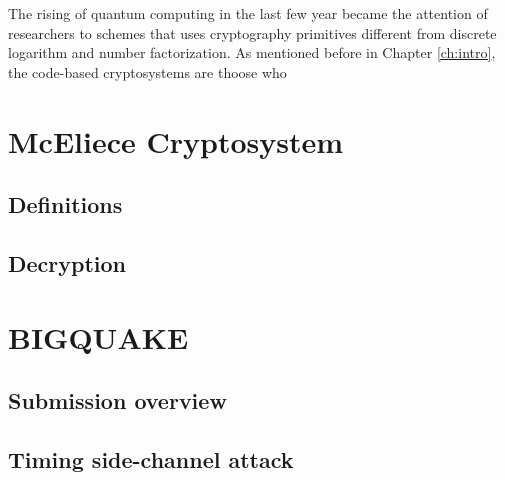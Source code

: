 The rising of quantum computing in the last few year became the attention of researchers to schemes that uses cryptography primitives different from discrete logarithm and number factorization. As mentioned before in Chapter \ref{ch:intro}, the code-based cryptosystems are thoose who 


\section{McEliece Cryptosystem}
\subsection{Definitions}
\subsection{Decryption}
\section{BIGQUAKE}
\subsection{Submission overview}
\subsection{Timing side-channel attack}